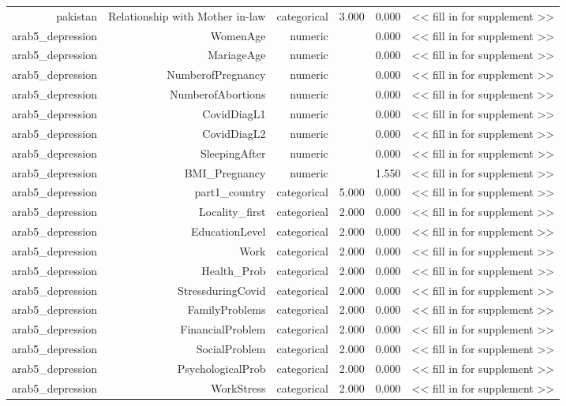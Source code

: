 \documentclass[10pt]{article}
\begin{document}
\begin{longtable}{rrrrrr}
pakistan & Relationship with Mother in-law & categorical & 3.000 & 0.000 & << fill in for supplement >> \\
arab5\_depression & WomenAge & numeric &  & 0.000 & << fill in for supplement >> \\
arab5\_depression & MariageAge & numeric &  & 0.000 & << fill in for supplement >> \\
arab5\_depression & NumberofPregnancy & numeric &  & 0.000 & << fill in for supplement >> \\
arab5\_depression & NumberofAbortions & numeric &  & 0.000 & << fill in for supplement >> \\
arab5\_depression & CovidDiagL1 & numeric &  & 0.000 & << fill in for supplement >> \\
arab5\_depression & CovidDiagL2 & numeric &  & 0.000 & << fill in for supplement >> \\
arab5\_depression & SleepingAfter & numeric &  & 0.000 & << fill in for supplement >> \\
arab5\_depression & BMI\_Pregnancy & numeric &  & 1.550 & << fill in for supplement >> \\
arab5\_depression & part1\_country & categorical & 5.000 & 0.000 & << fill in for supplement >> \\
arab5\_depression & Locality\_first & categorical & 2.000 & 0.000 & << fill in for supplement >> \\
arab5\_depression & EducationLevel & categorical & 2.000 & 0.000 & << fill in for supplement >> \\
arab5\_depression & Work & categorical & 2.000 & 0.000 & << fill in for supplement >> \\
arab5\_depression & Health\_Prob & categorical & 2.000 & 0.000 & << fill in for supplement >> \\
arab5\_depression & StressduringCovid & categorical & 2.000 & 0.000 & << fill in for supplement >> \\
arab5\_depression & FamilyProblems & categorical & 2.000 & 0.000 & << fill in for supplement >> \\
arab5\_depression & FinancialProblem & categorical & 2.000 & 0.000 & << fill in for supplement >> \\
arab5\_depression & SocialProblem & categorical & 2.000 & 0.000 & << fill in for supplement >> \\
arab5\_depression & PsychologicalProb & categorical & 2.000 & 0.000 & << fill in for supplement >> \\
arab5\_depression & WorkStress & categorical & 2.000 & 0.000 & << fill in for supplement >> \\

\end{longtable}
\end{document}
